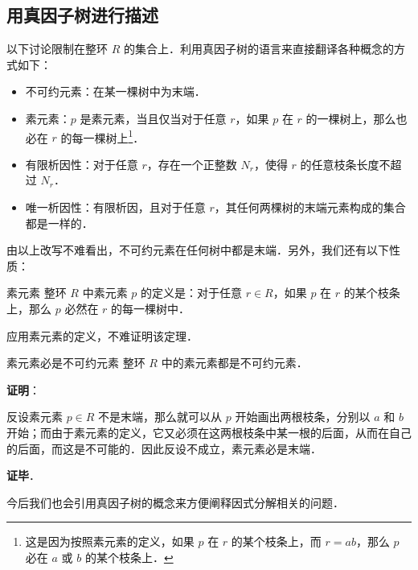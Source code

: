 

\subsection{用真因子树进行描述}

以下讨论限制在整环 $R$ 的集合上．利用真因子树的语言来直接翻译各种概念的方式如下：

\begin{definition}{}\label{FctTre_def1}
\begin{itemize}
\item 不可约元素：在某一棵树中为末端．
\item 素元素：$p$ 是素元素，当且仅当对于任意 $r$，如果 $p$ 在 $r$ 的一棵树上，那么也必在 $r$ 的每一棵树上\footnote{这是因为按照素元素的定义，如果 $p$ 在 $r$ 的某个枝条上，而 $r=ab$，那么 $p$ 必在 $a$ 或 $b$ 的某个枝条上．}．
\item 有限析因性：对于任意 $r$，存在一个正整数 $N_r$，使得 $r$ 的任意枝条长度不超过 $N_r$．
\item 唯一析因性：有限析因，且对于任意 $r$，其任何两棵树的末端元素构成的集合都是一样的．
\end{itemize}
\end{definition}

由以上改写不难看出，不可约元素在任何树中都是末端．另外，我们还有以下性质：

\begin{theorem}{素元素}
整环 $R$ 中素元素 $p$ 的定义是：对于任意 $r\in R$，如果 $p$ 在 $r$ 的某个枝条上，那么 $p$ 必然在 $r$ 的每一棵树中．
\end{theorem}

应用素元素的定义，不难证明该定理．


\begin{theorem}{素元素必是不可约元素}
整环 $R$ 中的素元素都是不可约元素．
\end{theorem}

\textbf{证明}：

反设素元素 $p\in R$ 不是末端，那么就可以从 $p$ 开始画出两根枝条，分别以 $a$ 和 $b$ 开始；而由于素元素的定义，它又必须在这两根枝条中某一根的后面，从而在自己的后面，而这是不可能的．因此反设不成立，素元素必是末端．

\textbf{证毕}．

今后我们也会引用真因子树的概念来方便阐释因式分解相关的问题．

